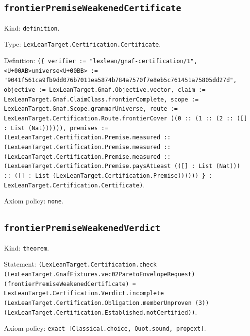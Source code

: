 \documentclass[11pt]{article}
\begin{document}
\subsection*{\texttt{frontierPremiseWeakenedCertificate}}
\noindent Kind: \texttt{definition}.\par
\noindent Type: \texttt{LexLeanTarget.Certification.Certificate}.\par
\noindent Definition: \texttt{(\{ verifier := "lexlean/gnaf-certification/1", <U+00AB>universe<U+00BB> := "9041f561ca9fb9dd076b7011ea5874b784a7570f7e8eb5c761451a75805dd27d", objective := LexLeanTarget.Gnaf.Objective.vector, claim := LexLeanTarget.Gnaf.ClaimClass.frontierComplete, scope := LexLeanTarget.Gnaf.Scope.grammarUniverse, route := LexLeanTarget.Certification.Route.frontierCover ((0 :: (1 :: (2 :: ([] : List (Nat)))))), premises := (LexLeanTarget.Certification.Premise.measured :: (LexLeanTarget.Certification.Premise.measured :: (LexLeanTarget.Certification.Premise.measured :: (LexLeanTarget.Certification.Premise.paysAtLeast (([] : List (Nat))) :: ([] : List (LexLeanTarget.Certification.Premise)))))) \} : LexLeanTarget.Certification.Certificate)}.\par
\noindent Axiom policy: \texttt{none}.\par
\subsection*{\texttt{frontierPremiseWeakenedVerdict}}
\noindent Kind: \texttt{theorem}.\par
\noindent Statement: \texttt{(LexLeanTarget.Certification.check (LexLeanTarget.GnafFixtures.vec02ParetoEnvelopeRequest) (frontierPremiseWeakenedCertificate) = LexLeanTarget.Certification.Verdict.incomplete (LexLeanTarget.Certification.Obligation.memberUnproven (3)) (LexLeanTarget.Certification.Established.notCertified))}.\par
\noindent Axiom policy: \texttt{exact [Classical.choice, Quot.sound, propext]}.\par
\end{document}
